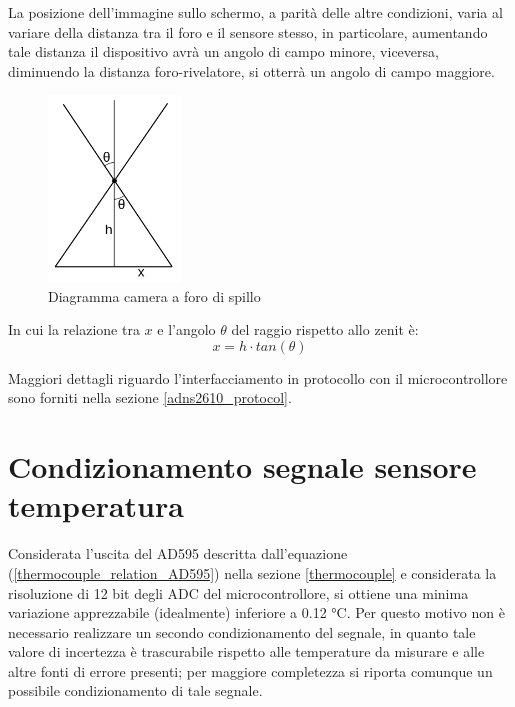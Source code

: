 \documentclass[12pt]{article}
\begin{document}
    
    La posizione dell'immagine sullo schermo, a parità delle altre condizioni, varia al variare della distanza tra il foro e il sensore stesso, in particolare, aumentando tale distanza il dispositivo avrà un angolo di campo minore, viceversa, diminuendo la distanza foro-rivelatore, si otterrà un angolo di campo maggiore.
    
    \begin{figure}[h]
        \centering
        \includegraphics[width=100pt]{Draws/Pinhole_diagram}
        \caption{Diagramma camera a foro di spillo}
        \label{fig:pinhole_diagram}
    \end{figure}
    
    
    In cui la relazione tra $x$ e l'angolo $\theta$ del raggio rispetto allo zenit è:
    \begin{equation}\label{pinhole_angle_relation}
        x = h \cdot tan(\theta)
    \end{equation}
    
    
    Maggiori dettagli riguardo l'interfacciamento in protocollo con il microcontrollore sono forniti nella sezione \ref{adns2610_protocol}.
    
    
 
\section{Condizionamento segnale sensore temperatura}\label{conditioning}
    Considerata l'uscita del AD595 descritta dall'equazione (\ref{thermocouple_relation_AD595}) nella sezione \ref{thermocouple} e considerata la risoluzione di 12 bit degli ADC del microcontrollore, si ottiene una minima variazione apprezzabile (idealmente) inferiore a 0.12 °C. Per questo motivo non è necessario realizzare un secondo condizionamento del segnale, in quanto tale valore di incertezza è trascurabile rispetto alle temperature da misurare e alle altre fonti di errore presenti; per maggiore completezza si riporta comunque un possibile condizionamento di tale segnale. \\
    
\end{document}
